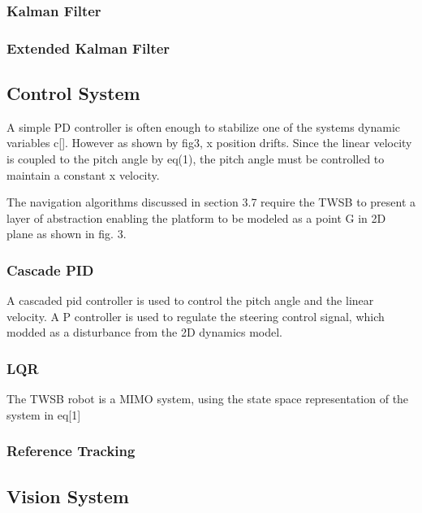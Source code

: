         \subsubsection{Kalman Filter}
        \subsubsection{Extended Kalman Filter}
    \subsection{Control System}
       
        A simple PD controller is often enough to stabilize one of the systems dynamic variables c[].
        However as shown by fig3, x position drifts. Since the linear velocity is coupled to the
        pitch angle by eq(1), the pitch angle must be controlled to maintain a constant x velocity. 
       
        The navigation algorithms discussed in section 3.7 require the 
        TWSB to present a layer of abstraction enabling the platform to be modeled as a point G in 2D plane 
        as shown in fig. 3. 

        \subsubsection{Cascade PID}
        A cascaded pid controller is used to control the pitch angle and the linear velocity.
        A P controller is used to regulate the steering control signal, which modded
        as a disturbance from the 2D dynamics model. 
        \subsubsection{LQR}
        The TWSB robot is a MIMO system, using the state space representation of the system in eq[1]
        



        \subsubsection{Reference Tracking}

 

    \subsection{Vision System}
